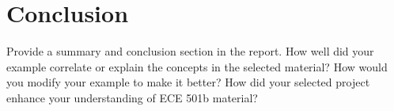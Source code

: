 \documentclass[conference]{IEEEtran}
\begin{document}
	\section{Conclusion}
	Provide a summary and conclusion section in the report. How well did your
example correlate or explain the concepts in the selected material? How would you modify your
example to make it better? How did your selected project enhance your understanding of ECE
501b material?
	
	\nocite{shlens_2014_tutorial}
	\nocite{jaradet_svd_image_compression}
	\nocite{omar_image_compression}
	\newpage
	{}
	
\end{document}
